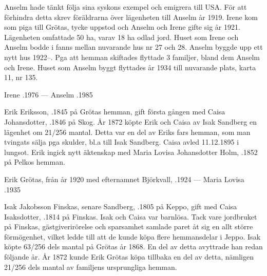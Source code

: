 Anselm hade tänkt följa sina syskons exempel och emigrera till USA. För att förhindra detta skrev föräldrarna över lägenheten till Anselm år 1919. Irene kom som piga till Grötas, tycke uppstod och Anselm och Irene gifte sig år 1921. Lägenheten omfattade 50 ha, varav 18 ha odlad jord. Huset som Irene och Anselm bodde i fanns mellan nuvarande hus nr 27 och 28. Anselm byggde upp ett nytt hus 1922--. Pga att hemman skiftades flyttade 3 familjer, bland dem Anselm och Irene. Huset som Anselm byggt flyttades år 1934 till nuvarande plats, karta 11, nr 135.

Irene .1976  ---  Anselm .1985


%
Erik Eriksson, .1845 på Grötas hemman, gift första gången med Caisa Johansdotter, .1846 på Skog. År 1872 köpte Erik och Caisa av Isak Sandberg en lägenhet om 21/256 mantal. Detta var en del av  Eriks fars hemman, som man tvingats sälja pga  skulder, bl.a till Isak Sandberg. Caisa avled 11.12.1895 i lungsot. Erik ingick nytt äktenskap med Maria Lovisa Johansdotter Holm, .1852 på Pelkos hemman.
\begin{jhchildren}
  \item {}
  \item {}
  \item {}
  \item {}
  \item {}
\end{jhchildren}

Erik Grötas, från år 1920 med efternamnet Björkvall, .1924  ---  Maria Lovisa .1935


%
Isak Jakobsson Finskas, senare Sandberg, .1805 på Keppo, gift med Caisa Isaksdotter, .1814 på Finskas. Isak och Caisa var barnlösa. Tack vare jordbruket på Finskas, gästgiverirörelse och sparsamhet samlade paret åt sig en allt större förmögenhet, vilket ledde till att de kunde köpa flere hemmansdelar i Jeppo. Isak köpte 63/256 dels mantal på Grötas år 1868. En del av detta avyttrade han redan följande år. År 1872 kunde Erik Grötas köpa tillbaka en del av detta, nämligen 21/256 dels mantal av familjens ursprungliga hemman.


